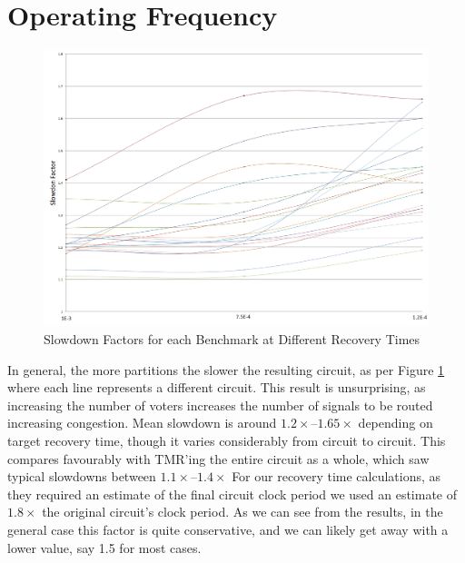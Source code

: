 \documentclass[12pt,final,oneside]{dwThesis} %
\begin{document}
   \section{Operating Frequency}
      \begin{figure}

      \begin{center}

         \includegraphics[width=\textwidth]{images/slowdown.png}
         \caption{Slowdown Factors for each Benchmark at Different Recovery Times} \label{slowdownFig} 
      \end{center}


   \end{figure}
   In general, the more partitions the slower the
   resulting circuit, as per Figure \ref{slowdownFig} where each line represents a different circuit. This result is unsurprising, as increasing the number of
   voters increases the number of signals to be routed increasing congestion.
   Mean slowdown is around $1.2\times$--$1.65\times$ depending on target recovery time, though
   it varies considerably from circuit to circuit.
   This compares favourably with \gls{TMR}'ing the entire circuit as a whole, which saw typical slowdowns between $1.1\times$--$1.4\times$
     For our recovery time
   calculations, as they required an estimate of the final circuit clock period
   we used an estimate of $1.8\times$ the original circuit's clock period. As
   we can see from the results, in the general case this factor is quite
   conservative, and we can likely get away with a lower value, say 1.5 for
   most cases.
   
\end{document}

